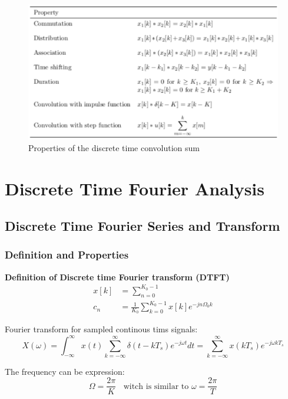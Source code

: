 \documentclass{article}
\begin{document}
\newpage
\begin{figure}[!h]
    \centering
    \includegraphics[width=12cm]{image/properties_of_the_discreate_time_convolution_sum.pdf}
    \caption{Properties of the discrete time convolution sum}
    \label{fig:properties_of_the_discreate_time_convolution_sum}
\end{figure}


\newpage
\section{Discrete Time Fourier Analysis}
\subsection{Discrete Time Fourier Series and Transform}
\subsubsection{Definition and Properties}
\textbf{Definition of Discrete time Fourier transform (DTFT)}
\begin{align*}
    x[k] &= \sum_{n=0}^{K_0-1} \\
    c_n  &= \frac{1}{K_0}\sum_{k=0}^{K_0-1} x[k]e^{-jn\Omega_0k}
\end{align*}

Fourier transform for sampled continous tims signals:
\begin{equation*}
    X(\omega) 
    = \int_{-\infty}^{\infty}x(t) \sum_{k=-\infty}^{\infty} \delta(t-kT_s)e^{-j\omega t}dt
    = \sum_{k=-\infty}^{\infty} x(kT_s)e^{-j\omega kT_s}
\end{equation*}

The frequency can be expression:
\begin{equation*}
    \Omega = \frac{2\pi}{K} \;\; \text{ witch is similar to } \omega=\frac{2\pi}{T}
\end{equation*}
\end{document}
